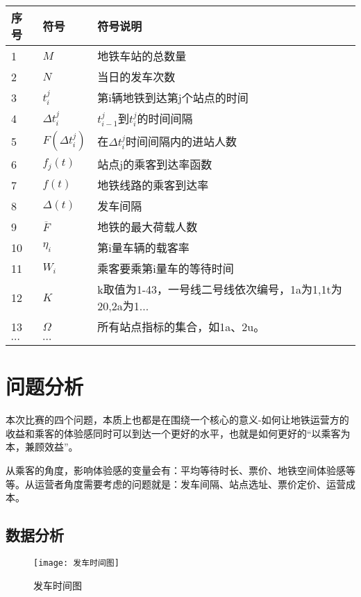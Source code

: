 \documentclass[12pt,a4paper]{mcmthesis}
\newcommand{\headcol}{\rowcolor{tableheadcolor}}
\begin{document}
\begin{table}[h!]
	\centering
	\small
	\begin{tabular}{p{60pt}<{\centering}|p{60pt}<{\centering}p{180pt}<{\raggedright}}
		\hline
		\headcol 序号 & 符号 & 符号说明 \\
		\hline
		1 & $M$ & 地铁车站的总数量 \\
		2 & $N$ & 当日的发车次数\\
		3 & $t_{i}^{j}$ & 第i辆地铁到达第j个站点的时间\\
		4 & $\Delta {t_i^j}$ & $t_{i-1}^{j}$到$t_i^j$的时间间隔\\
		5 & $F(\Delta {t_i^j})$ & 在$\Delta t_i^j$时间间隔内的进站人数\\
		6 & $f_j(t)$ & 站点j的乘客到达率函数 \\
		7 & ${f(t)}$ & 地铁线路的乘客到达率\\
		8 & $\Delta(t)$ & 发车间隔 \\
		9 & $\overline{F}$ & 地铁的最大荷载人数 \\
		10 & $\eta_i$ & 第i量车辆的载客率\\
		11 & $W_i$ & 乘客要乘第i量车的等待时间 \\
		12 & $K$ & k取值为1-43，一号线二号线依次编号，1a为1,1t为20,2a为1... \\
		13 & $\Omega$ & 所有站点指标的集合，如1a、2u。 \\
		$\cdots$ & $\cdots$\\
		\hline
	\end{tabular}
	\label{symbol}
\end{table}



\section{问题分析}

本次比赛的四个问题，本质上也都是在围绕一个核心的意义-如何让地铁运营方的收益和乘客的体验感同时可以到达一个更好的水平，也就是如何更好的“以乘客为本，兼顾效益”。

从乘客的角度，影响体验感的变量会有：平均等待时长、票价、地铁空间体验感等等。从运营者角度需要考虑的问题就是：发车间隔、站点选址、票价定价、运营成本。


\subsection{数据分析}
\begin{figure}[h!t]
	\centerline{\texttt{[image: 发车时间图]}\quad
	}
	\caption{\song\wuhao
		发车时间图}
	\label{fig:发车时间图}
\end{figure}
\end{document}
